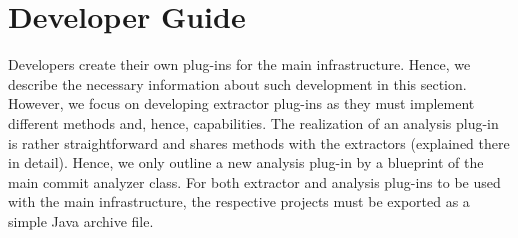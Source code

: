 \section{Developer Guide}
\label{sec:DeveloperGuide}
Developers create their own plug-ins for the main infrastructure.
Hence, we describe the necessary information about such development in this section.
However, we focus on developing extractor plug-ins as they must implement different methods and, hence, capabilities.
The realization of an analysis plug-in is rather straightforward and shares methods with the extractors (explained there in detail).
Hence, we only outline a new analysis plug-in by a blueprint of the main commit analyzer class.
For both extractor and analysis plug-ins to be used with the main infrastructure, the respective projects must be exported as a simple Java archive file.



